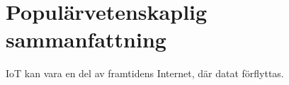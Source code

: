\section*{Populärvetenskaplig sammanfattning}
IoT kan vara en del av framtidens Internet, där datat förflyttas.